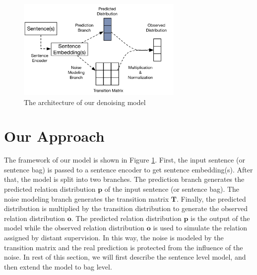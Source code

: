 

\begin{figure}[htbp]
\begin{center}
\includegraphics[width=8cm]{figures/denoise_framework.png}	
\caption{The architecture of our denoising model}
\label{fig: denoise_framework}
\end{center}
\end{figure}


\section{Our Approach}
The framework of our model is shown in Figure \ref{fig: denoise_framework}. First, the input sentence (or sentence bag) is passed to a sentence encoder to get sentence embedding(s). After that, the model is split into two branches. The prediction branch generates the predicted relation distribution $\mathbf{p}$ of the input sentence (or sentence bag). The noise modeling branch generates the transition matrix $\mathbf{T}$. Finally, the predicted distribution is multiplied by the transition distribution to generate the observed relation distribution $\mathbf{o}$. The predicted relation distribution $\mathbf{p}$ is the output of the model while the observed relation distribution $\mathbf{o}$ is used to simulate the relation assigned by distant supervision. In this way, the noise is modeled by the transition matrix and the real prediction is protected from the influence of the noise. In rest of this section, we will first describe the sentence level model, and then extend the model to bag level.


